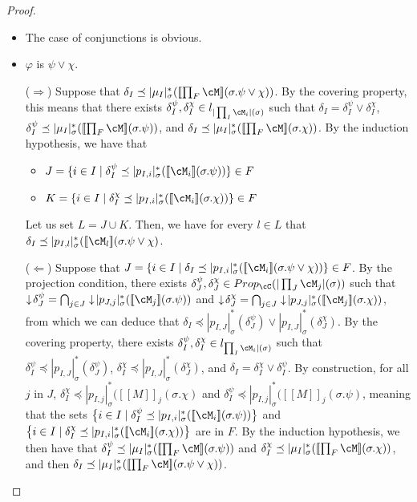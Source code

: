 \documentclass[preprint,3p,times]{elsarticle}
\def\sem#1{[\![ #1 ] \!]}
\newcommand{\bigset}[1]{\big\{#1\big\}}                     %
\begin{document}
\begin{proof}
\begin{itemize}
        \item The case of conjunctions is obvious. 

        \item $\varphi$ is $\psi \vee \chi$.

        \medskip
        ($\Rightarrow$) Suppose that $\delta_I \preceq |\mu_I|^*_\sigma(\sem{\prod_F \cM}(\sigma.\psi \vee \chi))$. By the covering property, this means that there exists $\delta^\psi_I,\delta^\chi_I \in l_{|\prod_I \cM_i|(\sigma)}$ such that $\delta_I = \delta^\psi_I \vee \delta^\chi_I$, $\delta^\psi_I \preceq |\mu_I|^*_\sigma(\sem{\prod_F \cM}(\sigma.\psi))$, and $\delta_I \preceq |\mu_I|^*_\sigma(\sem{\prod_F \cM}(\sigma.\chi))$. By the induction hypothesis, we have that
        \begin{itemize}
            \item $J = \{i \in I \mid \delta^\psi_I \preceq |p_{I,i}|^*_\sigma(\sem{\cM_i}(\sigma.\psi))\} \in F$
            \item $K = \{i \in I \mid \delta^\chi_I \preceq |p_{I,i}|^*_\sigma(\sem{\cM_i}(\sigma.\chi))\} \in F$
        \end{itemize}

        
        Let us set $L = J \cup K$. Then, we have for every $l \in L$ that $\delta_I \preceq |p_{I,l}|^*_\sigma(\sem{\cM_l}(\sigma.\psi \vee \chi)$. 

        \medskip
        ($\Leftarrow$) Suppose that $J = \{i \in I \mid \delta_I \preceq |p_{I,i}|^*_\sigma(\sem{\cM_i}(\sigma.\psi \vee \chi))\} \in F$. By the projection condition, there exists $\delta^\psi_J,\delta^\chi_J \in Prop_\cC(|\prod_J \cM_j|(\sigma))$ such that $\downarrow\!\delta^\psi_J = \bigcap_{j \in J} \downarrow\!|p_{J,j}|^*_\sigma(\sem{\cM_j}(\sigma.\psi))$ and $\downarrow\!\delta^\chi_J =  \bigcap_{j \in J} \downarrow\!|p_{J,j}|^*_\sigma(\sem{\cM_j}(\sigma.\chi))$, from which we can deduce that $\delta_I \preceq |p_{I,J}|^*_\sigma(\delta^\psi_J) \vee |p_{I,J}|^*_\sigma(\delta^\chi_J)$.
        By the covering property, there exists $\delta^\psi_I,\delta^\chi_I \in l_{\prod_I \cM_i|(\sigma)}$ such that $\delta^\psi_I \preceq |p_{I,J}|^*_\sigma(\delta^\psi_J)$, $\delta^\chi_I \preceq |p_{I,J}|^*_\sigma(\delta^\chi_J)$, and \(\delta_I = \delta^\chi_I \vee \delta^\psi_I\).
        By construction, for all \(j\) in \(J\), \(\delta_I^\chi \preceq |p_{I,j}|^*_\sigma(\sem M_j (\sigma.\chi)\) and \(\delta_I^\psi \preceq |p_{I,j}|^*_\sigma(\sem M_j (\sigma.\psi)\), meaning that the sets \(\bigset{i \in I \mid \delta^\psi_I \preceq |p_{I,i}|^*_\sigma(\sem{\cM_i}(\sigma.\psi))}\) and \(\bigset{i \in I \mid \delta^\chi_I \preceq |p_{I,i}|^*_\sigma(\sem{\cM_i}(\sigma.\chi))}\) are in \(F\).
        By the induction hypothesis, we then have that $\delta^\psi_I \preceq |\mu_I|^*_\sigma(\sem{\prod_F \cM}(\sigma.\psi))$ and $\delta^\chi_I \preceq |\mu_I|^*_\sigma(\sem{\prod_F \cM}(\sigma.\chi))$, and then $\delta_I \preceq |\mu_I|^*_\sigma(\sem{\prod_F \cM}(\sigma.\psi \vee \chi))$.


\end{itemize}
\end{proof}
\end{document}
